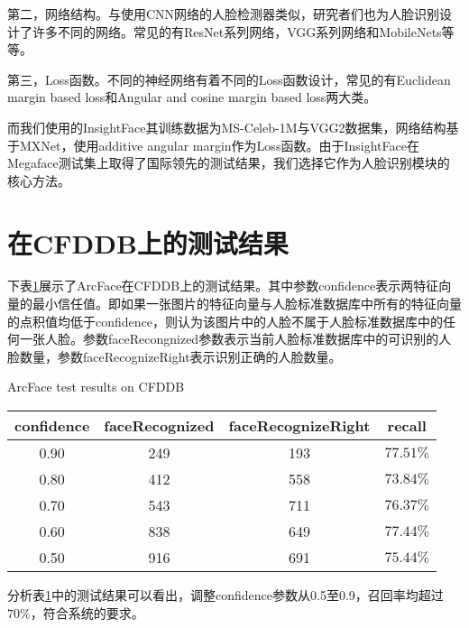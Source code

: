 第二，网络结构。与使用CNN网络的人脸检测器类似，研究者们也为人脸识别设计了许多不同的网络。常见的有ResNet系列网络\cite{he2016deep}，VGG系列网络\cite{simonyan2014very}和MobileNets\cite{howard2017mobilenets}等等。

第三，Loss函数。不同的神经网络有着不同的Loss函数设计，常见的有Euclidean margin based loss和Angular and cosine margin based loss两大类。

而我们使用的InsightFace其训练数据为MS-Celeb-1M\cite{guo2016msceleb}与VGG2\cite{cao2017vggface2}数据集，网络结构基于MXNet\cite{chen2015mxnet}，使用additive angular margin作为Loss函数。由于InsightFace在Megaface测试集上取得了国际领先的测试结果，我们选择它作为人脸识别模块的核心方法。

\section{在CFDDB上的测试结果}

下表\ref{tab:arcface}展示了ArcFace在CFDDB上的测试结果。其中参数confidence表示两特征向量的最小信任值。即如果一张图片的特征向量与人脸标准数据库中所有的特征向量的点积值均低于confidence，则认为该图片中的人脸不属于人脸标准数据库中的任何一张人脸。参数faceRecongnized参数表示当前人脸标准数据库中的可识别的人脸数量，参数faceRecognizeRight表示识别正确的人脸数量。

\begin{table}[!hpb]
	\centering
	{ArcFace test results on CFDDB}
	\label{tab:arcface}
	\begin{tabular}{ ccc | c }
		\hline
		confidence & faceRecognized & faceRecognizeRight &  recall\\
		\hline
		0.90 & 249 & 193 & $77.51\%$\\
		0.80 & 412 & 558 & $73.84\%$\\
		0.70 & 543 & 711 & $76.37\%$\\
		0.60 & 838 & 649 & $77.44\%$\\
		0.50 & 916 & 691 & $75.44\%$\\
		\hline
	\end{tabular}
\end{table}

分析表\ref{tab:arcface}中的测试结果可以看出，调整confidence参数从0.5至0.9，召回率均超过$70\%$，符合系统的要求。
